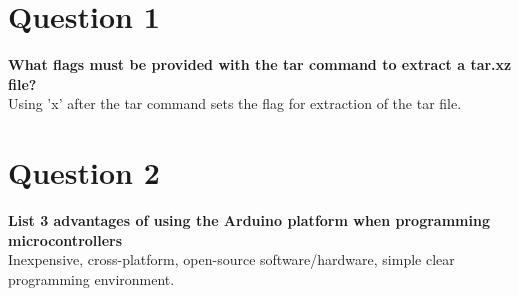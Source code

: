 \documentclass{article}
\begin{document}

\section{Question 1}
\textbf{What flags must be provided with the tar command to extract a tar.xz file?}\\ 

Using 'x' after the tar command sets the flag for extraction of the tar file.

\section{Question 2}
\textbf{List 3 advantages of using the Arduino platform when programming microcontrollers}\\

Inexpensive, cross-platform, open-source software/hardware, simple clear programming environment.
\end{document}
